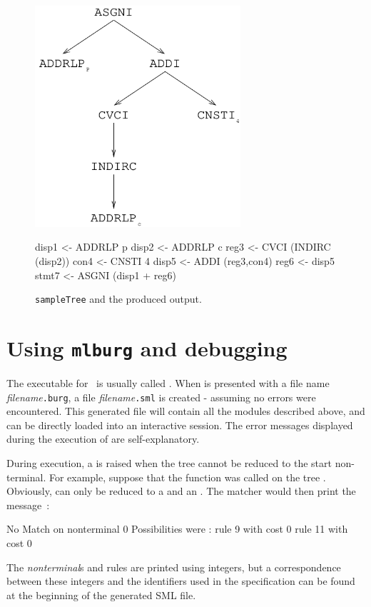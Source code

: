 \documentclass[11pt]{article}
\begin{document}
\begin{figure}
  \begin{center}
    \includegraphics[width=3in]{tree}
  \end{center}%

\vskip 1in

\begin{centercode}
disp1 <- ADDRLP p
disp2 <- ADDRLP c
reg3 <- CVCI (INDIRC (disp2))
con4 <- CNSTI 4
disp5 <- ADDI (reg3,con4)
reg6 <- disp5
stmt7 <- ASGNI (disp1 + reg6)
\end{centercode}
 \caption{{\tt sampleTree} and the produced output.}
 \label{ex:output}
\end{figure}

	\section{Using {\tt mlburg} and debugging}

The executable for \mlburg\ is usually called .  When  is
presented with a file name {\em filename}{\tt .burg}, a file {\em
filename}{\tt .sml} is created - assuming no errors were encountered. This
generated file will contain all the modules described above, and can be
directly loaded into an interactive session.  The error messages displayed
during the execution of  are self-explanatory.

During execution, a  is raised when the tree cannot be reduced
to the start non-terminal.  For example, suppose that the function
 was called on the tree .  Obviously,  can
only be reduced to a  and an .  The matcher would then print
the message~:
\begin{code}
    No Match on nonterminal 0
    Possibilities were :
    rule 9 with cost 0
    rule 11 with cost 0
\end{code}
The {\sl nonterminal}s and rules are printed using integers, but a
correspondence between these integers and the identifiers used in the
specification can be found at the beginning of the generated SML file.
\end{document}
